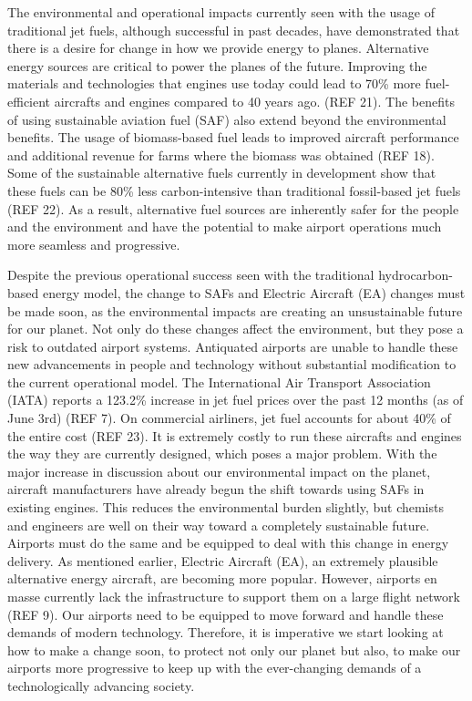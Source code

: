 \documentclass{article}
\begin{document}
The environmental and operational impacts currently seen with the usage of traditional jet fuels, although successful in past decades, have demonstrated that there is a desire for change in how we provide energy to planes. Alternative energy sources are critical to power the planes of the future. Improving the materials and technologies that engines use today could lead to 70\% more fuel-efficient aircrafts and engines compared to 40 years ago.  (REF 21). The benefits of using sustainable aviation fuel (SAF) also extend beyond the environmental benefits. The usage of biomass-based fuel leads to improved aircraft performance and additional revenue for farms where the biomass was obtained (REF 18). Some of the sustainable alternative fuels currently in development show that these fuels can be 80\% less carbon-intensive  than traditional fossil-based jet fuels (REF 22). As a result, alternative fuel sources are inherently safer for the people and the environment and have the potential to make airport operations much more seamless and progressive. \par 
Despite the previous operational success seen with the traditional hydrocarbon-based energy model, the change to SAFs and Electric Aircraft (EA) changes must be made soon, as the environmental impacts are creating an unsustainable future for our planet. Not only do these changes affect the environment, but they pose a risk to outdated airport systems. Antiquated airports are unable to handle these new advancements in people and technology without substantial modification to the current operational model. The International Air Transport Association (IATA) reports a 123.2\% increase in jet fuel prices over the past 12 months (as of June 3rd) (REF 7). On commercial airliners, jet fuel accounts for about 40\% of the entire cost (REF 23).  It is extremely costly to run these aircrafts and engines the way they are currently designed, which poses a major problem.   With the major increase in discussion about our environmental impact on the planet, aircraft manufacturers have already begun the shift towards using SAFs in existing engines. This reduces the environmental burden slightly, but chemists and engineers are well on their way toward a completely sustainable future.  Airports must do the same and be equipped to deal with this change in energy delivery. As mentioned earlier, Electric Aircraft (EA), an extremely plausible alternative energy aircraft, are becoming more popular. However, airports en masse currently lack the infrastructure to support them on a large flight network (REF 9). Our airports need to be equipped to move forward and handle these demands of modern technology. Therefore, it is imperative we start looking at how to make a change soon, to protect not only our planet but also, to make our airports more progressive to keep up with the ever-changing demands of a technologically advancing society.\par  
\end{document}
